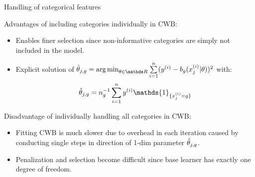 \documentclass[11pt,compress,t,notes=noshow, xcolor=table]{beamer}
\begin{document}
\begin{vbframe}{Handling of categorical features}
\framebreak

Advantages of including categories individually in CWB: 
\begin{itemize}
    \item 
        Enables finer selection since non-informative categories are simply not included in the model. %

    \item 
        Explicit solution of $\thetah_{j,g} = \argmin_{\theta\in\R}\sumin (\yi - b_g(x^{(i)}_j|\theta))^2$ with:
        $$\thetah_{j,g} = n_g^{-1}\sumin \yi \mathds{1}_{\{x^{(i)}_j = g\}}$$
\end{itemize}

Disadvantage of individually handling all categories in CWB:
\begin{itemize}
    \item 
        Fitting CWB is much slower due to overhead in each iteration %
        caused by conducting single steps in direction of 1-dim parameter $\hat{\theta}_{j,g}$.

    \item 
        Penalization and selection become difficult since base learner has exactly one degree of freedom.
\end{itemize}

\end{vbframe}

\end{document}
